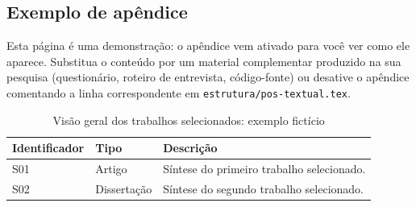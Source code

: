 \begin{apendicesenv}
\renewcommand{\appendixtocname}{\texorpdfstring{\MakeUppercase{\apendicesname}}{\apendicesname}}

\partapendices

\chapter{Exemplo de apêndice}
\label{apendice:trabalhos}

Esta página é uma demonstração: o apêndice vem ativado para você ver como
ele aparece. Substitua o conteúdo por um material complementar produzido
na sua pesquisa (questionário, roteiro de entrevista, código-fonte) ou
desative o apêndice comentando a linha correspondente em
\texttt{estrutura/pos-textual.tex}.

\begin{table}[htb]
  \centering
  \caption{Visão geral dos trabalhos selecionados: exemplo fictício}
  \label{tab:appendix-trabalhos-aprovados}
  {\ABNTEXfontereduzida
  \begin{tabularx}{\linewidth}{llX}
    \toprule
    \textbf{Identificador} & \textbf{Tipo} & \textbf{Descrição} \\
    \midrule
    S01 & Artigo & Síntese do primeiro trabalho selecionado. \\
    S02 & Dissertação & Síntese do segundo trabalho selecionado. \\
    \bottomrule
  \end{tabularx}}
\end{table}
\end{apendicesenv}
